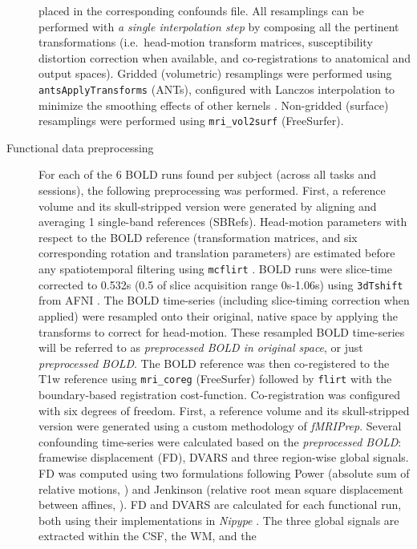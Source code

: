\documentclass[
]{article}
\begin{document}
\begin{description}
placed in the corresponding confounds file. All resamplings can be
performed with \emph{a single interpolation step} by composing all the
pertinent transformations (i.e.~head-motion transform matrices,
susceptibility distortion correction when available, and
co-registrations to anatomical and output spaces). Gridded (volumetric)
resamplings were performed using \texttt{antsApplyTransforms} (ANTs),
configured with Lanczos interpolation to minimize the smoothing effects
of other kernels \citep{lanczos}. Non-gridded (surface) resamplings were
performed using \texttt{mri\_vol2surf} (FreeSurfer).
\item[Functional data preprocessing]
For each of the 6 BOLD runs found per subject (across all tasks and
sessions), the following preprocessing was performed. First, a reference
volume and its skull-stripped version were generated by aligning and
averaging 1 single-band references (SBRefs). Head-motion parameters with
respect to the BOLD reference (transformation matrices, and six
corresponding rotation and translation parameters) are estimated before
any spatiotemporal filtering using \texttt{mcflirt} \citep[FSL
6.0.5.1:57b01774,][]{mcflirt}. BOLD runs were slice-time corrected to
0.532s (0.5 of slice acquisition range 0s-1.06s) using \texttt{3dTshift}
from AFNI \citep[RRID:SCR\_005927]{afni}. The BOLD time-series
(including slice-timing correction when applied) were resampled onto
their original, native space by applying the transforms to correct for
head-motion. These resampled BOLD time-series will be referred to as
\emph{preprocessed BOLD in original space}, or just \emph{preprocessed
BOLD}. The BOLD reference was then co-registered to the T1w reference
using \texttt{mri\_coreg} (FreeSurfer) followed by \texttt{flirt}
\citep[FSL 6.0.5.1:57b01774,][]{flirt} with the boundary-based
registration \citep{bbr} cost-function. Co-registration was configured
with six degrees of freedom. First, a reference volume and its
skull-stripped version were generated using a custom methodology of
\emph{fMRIPrep}. Several confounding time-series were calculated based
on the \emph{preprocessed BOLD}: framewise displacement (FD), DVARS and
three region-wise global signals. FD was computed using two formulations
following Power (absolute sum of relative motions,
\citet{power_fd_dvars}) and Jenkinson (relative root mean square
displacement between affines, \citet{mcflirt}). FD and DVARS are
calculated for each functional run, both using their implementations in
\emph{Nipype} \citep[following the definitions by][]{power_fd_dvars}.
The three global signals are extracted within the CSF, the WM, and the

\end{description}
\end{document}
